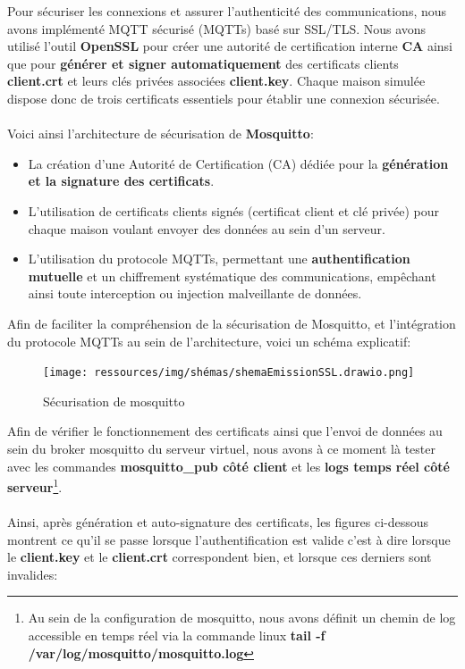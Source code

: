 \documentclass[10pt, a4paper]{report}
\begin{document}
	Pour sécuriser les connexions et assurer l'authenticité des communications, nous avons implémenté MQTT sécurisé (MQTTs) basé sur SSL/TLS. Nous avons utilisé l’outil \textbf{OpenSSL} pour créer une autorité de certification interne \textbf{CA} ainsi que pour \textbf{générer et signer automatiquement} des certificats clients \textbf{client.crt} et leurs clés privées associées \textbf{client.key}. Chaque maison simulée dispose donc de trois certificats essentiels pour établir une connexion sécurisée.\\\\
	Voici ainsi l'architecture de sécurisation de \textbf{Mosquitto}:
	\begin{itemize}
		 \item La création d'une Autorité de Certification (CA) dédiée pour la \textbf{génération et la signature des certificats}.
		\item L'utilisation de certificats clients signés (certificat client et clé privée) pour chaque maison voulant envoyer des données au sein d'un serveur.
		\item L'utilisation du protocole MQTTs, permettant une \textbf{authentification mutuelle} et un chiffrement systématique des communications, empêchant ainsi toute interception ou injection malveillante de données.
	\end{itemize}
	
	\vspace{1cm}
	
	Afin de faciliter la compréhension de la sécurisation de Mosquitto, et l'intégration du protocole MQTTs au sein de l'architecture, voici un schéma explicatif: 
	\begin{figure}[h!]
		\centering
		\texttt{[image: ressources/img/shémas/shemaEmissionSSL.drawio.png]}
		\caption{Sécurisation de mosquitto}
		\label{fig:secuMosquitto}
	\end{figure}
	
	Afin de vérifier le fonctionnement des certificats ainsi que l'envoi de données au sein du broker mosquitto du serveur virtuel, nous avons à ce moment là tester avec les commandes \textbf{mosquitto\_pub côté client} et les \textbf{logs temps réel côté serveur}\footnote{Au sein de la configuration de mosquitto, nous avons définit un chemin de log accessible en temps réel via la commande linux \textbf{tail -f /var/log/mosquitto/mosquitto.log}}.\\\\ Ainsi, après génération et auto-signature des certificats, les figures ci-dessous montrent ce qu'il se passe lorsque l'authentification est valide c'est à dire lorsque le \textbf{client.key} et le \textbf{client.crt} correspondent bien, et lorsque ces derniers sont invalides:
	
\end{document}
